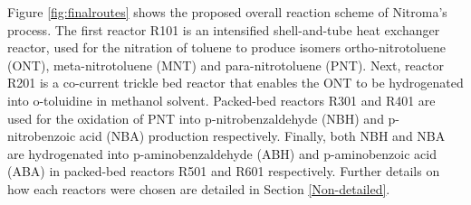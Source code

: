 Figure \ref{fig:finalroutes} shows the proposed overall reaction scheme of Nitroma's process. The first reactor R101 is an intensified shell-and-tube heat exchanger reactor, used for the nitration of toluene to produce isomers ortho-nitrotoluene (ONT), meta-nitrotoluene (MNT) and para-nitrotoluene (PNT). Next, reactor R201 is a co-current trickle bed reactor that enables the ONT to be hydrogenated into o-toluidine in methanol solvent. Packed-bed reactors R301 and R401 are used for the oxidation of PNT into p-nitrobenzaldehyde (NBH) and p-nitrobenzoic acid (NBA) production respectively. Finally, both NBH and NBA are hydrogenated into p-aminobenzaldehyde (ABH) and p-aminobenzoic acid (ABA) in packed-bed reactors R501 and R601 respectively. Further details on how each reactors were chosen are detailed in Section \ref{Non-detailed}. 




